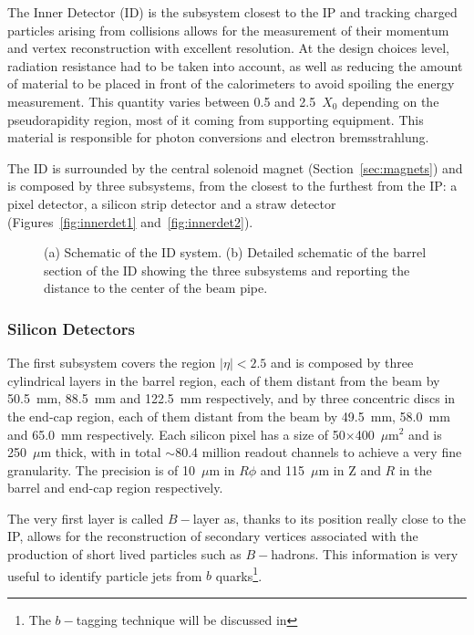 The Inner Detector (ID) is the subsystem closest to the IP and tracking charged particles arising from collisions allows for 
the measurement of their momentum and vertex reconstruction with excellent resolution. At the design choices level, radiation resistance had to
be taken into account, as well as reducing the amount of material to be placed in front of the calorimeters to avoid spoiling the energy measurement.
This quantity varies between 0.5 and 2.5~$X_0$ depending on the pseudorapidity region, most of it coming from supporting equipment. This material
is responsible for photon conversions and electron bremsstrahlung.

The ID is surrounded by the central solenoid magnet (Section~\ref{sec:magnets}) and is composed by three subsystems, 
from the closest to the furthest from the IP: a pixel detector, a silicon strip detector and
a straw detector (Figures~\ref{fig:innerdet1} and~\ref{fig:innerdet2}).

\begin{figure}[tb]\begin{center}
	\caption{(a) Schematic of the ID system. (b) Detailed schematic of the barrel section of the ID showing the
        three subsystems and reporting the distance to the center of the beam pipe.}
\end{center}\end{figure}


\subsubsection{Silicon Detectors}

The first subsystem covers the region $|\eta|<2.5$ and  is composed by three cylindrical layers in the barrel region, each of them distant from the beam by
50.5~mm, 88.5~mm and 122.5~mm respectively, and by three concentric discs in the end-cap region, each of them distant from the beam by
49.5~mm, 58.0~mm and 65.0~mm respectively.
Each silicon pixel has a size of 50$\times$400~$\mu$m$^{2}$ and is 250~$\mu$m thick, 
with in total $\sim$80.4 million readout channels to achieve a very fine granularity.
The precision is of 10~$\mu$m in $R\phi$ and 115~$\mu$m in Z and $R$ in the barrel and end-cap
region respectively.

The very first layer is called $B-$layer as, thanks to its position really close to the IP,
allows for the reconstruction of secondary vertices associated with the production of
 short lived particles such as $B-$hadrons. This information is very useful to identify
particle jets from $b$ quarks\footnote{The $b-$tagging technique will be discussed in %
}.

